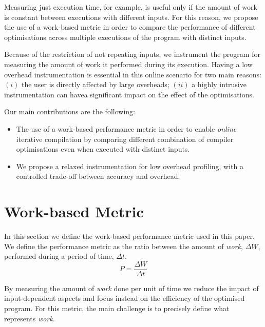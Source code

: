 \documentclass[sigplan,9pt]{acmart}
\newcommand{\itercomp}{{iterative compilation}}
\begin{document}
Measuring just execution time, for example, is useful only if the
amount of work is constant between executions with different inputs.
For this reason, we propose the use of a work-based metric in order
to compare the performance of different optimisations across 
multiple executions of the program with distinct inputs.

Because of the restriction of not repeating inputs, we instrument the program
for measuring the amount of work it performed during its execution.
Having a low overhead instrumentation is essential in this online scenario for
two main reasons:
$(i)$ the user is directly affected by large overheads;
$(ii)$ a highly intrusive instrumentation can havea significant impact on the
effect of the optimisations.

Our main contributions are the following:
\begin{itemize}
\item The use of a work-based performance metric in order to enable
\textit{online} {\itercomp} by comparing different combination of
compiler optimisations even when executed with distinct inputs.
\item We propose a relaxed instrumentation for low overhead profiling, with a controlled
trade-off between accuracy and overhead.
\end{itemize}

\section{Work-based Metric} \label{sec:metric}

In this section we define the work-based performance metric used in this paper.
We define the performance metric as the ratio between the amount of
\textit{work}, $\Delta W$, performed during a period of time, $\Delta t$.
\[
   P = \frac{\Delta W}{\Delta t}
\]

By measuring the amount of \textit{work} done per unit of time we reduce
the impact of input-dependent aspects and focus instead on the efficiency
of the optimised program.
For this metric, the main challenge is to precisely define what
represents \textit{work}.

\end{document}
